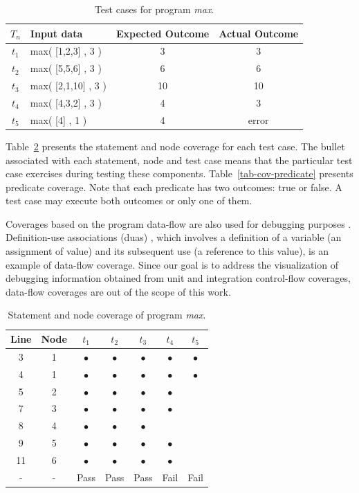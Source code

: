 \begin{table}
\center
\caption{Test cases for program \textit{max}.\label{tab-casoteste-tarantula}}
\begin{tabular}{c|l|c|c}
\hline $T_n$ & Input data & Expected Outcome & Actual Outcome\\
\hline $t_1$ & max( [1,2,3] , 3 ) & 3 & 3\\
\hline $t_2$ & max( [5,5,6] , 3 ) & 6 & 6\\
\hline $t_3$ & max( [2,1,10] , 3 ) & 10 & 10\\
\hline $t_4$ & max( [4,3,2] , 3 ) & 4 & 3\\
\hline $t_5$ & max( [4] , 1 ) & 4 & error\\
\hline
\end{tabular}
\end{table}

Table~\ref{tab-cov} presents the statement and node coverage for each test case.
The bullet associated with each statement, node and test case means that the
particular test case exercises during testing these components.
Table~\ref{tab-cov-predicate} presents predicate coverage.  Note that each
predicate has two outcomes: true or false. A test case may execute both outcomes
or only one of them.

Coverages based on the program data-flow are also used for debugging purposes
\cite{santelices09dataflow,chaim04DRT}. Definition-use associations (duas)
\cite{rapps85dataflow}, which involves a definition of a variable (an
assignment of value) and its subsequent use (a reference to this value), is an
example of data-flow coverage. Since our goal is to address the visualization
of debugging information obtained from unit and integration control-flow
coverages, data-flow coverages are out of the scope of this work.

\begin{table}
\center
\caption{Statement and node coverage of program \textit{max}.\label{tab-cov}}
\begin{tabular}{|c|c||c|c|c|c|c|}
  \hline Line & Node &$t_1$ & $t_2$ & $t_3$ & $t_4$ & $t_5$  \\
  \hline  3 & 1 & $\bullet$ & $\bullet$ & $\bullet$ & $\bullet$ & $\bullet$  \\
  \hline  4 & 1 & $\bullet$ & $\bullet$ & $\bullet$ & $\bullet$ & $\bullet$  \\
  \hline  5 & 2 & $\bullet$ & $\bullet$ & $\bullet$ & $\bullet$ &   \\
  \hline  7 & 3 & $\bullet$ & $\bullet$ & $\bullet$ & $\bullet$ &   \\
  \hline  8 & 4 & $\bullet$ & $\bullet$ & $\bullet$ &           &   \\
  \hline  9 & 5 & $\bullet$ & $\bullet$ & $\bullet$ & $\bullet$ &   \\
  \hline 11 & 6 & $\bullet$ & $\bullet$ & $\bullet$ & $\bullet$ &   \\
  \hline  - & - & Pass & Pass & Pass & Fail & Fail  \\
  \hline
\end{tabular}
\end{table}

